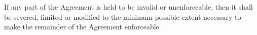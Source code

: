 \documentclass[nz-terms]{subfiles}
\begin{document}
If any part of the Agreement is held to be invalid or unenforceable, then it
shall be severed, limited or modified to the minimum possible extent necessary
to make the remainder of the Agreement enforceable.
\end{document}
